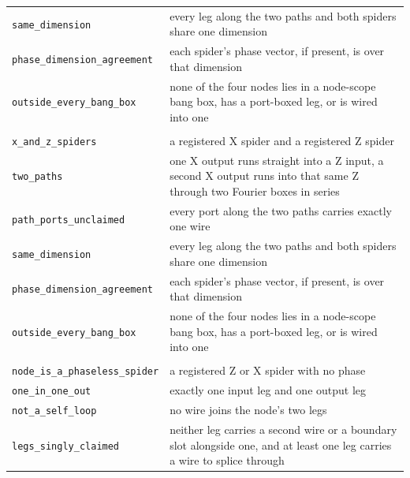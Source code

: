 \begin{xltabular}{\textwidth}{@{}>{\raggedright\arraybackslash}p{0.42\textwidth}>{\raggedright\arraybackslash}X@{}}
\quad\texttt{same\_\allowbreak{}dimension} & every leg along the two paths and both spiders share one dimension \\
\quad\texttt{phase\_\allowbreak{}dimension\_\allowbreak{}agreement} & each spider's phase vector, if present, is over that dimension \\
\quad\texttt{outside\_\allowbreak{}every\_\allowbreak{}bang\_\allowbreak{}box} & none of the four nodes lies in a node-scope bang box, has a port-boxed leg, or is wired into one \\
\midrule
{}\\
\quad\texttt{x\_\allowbreak{}and\_\allowbreak{}z\_\allowbreak{}spiders} & a registered X spider and a registered Z spider \\
\quad\texttt{two\_\allowbreak{}paths} & one X output runs straight into a Z input, a second X output runs into that same Z through two Fourier boxes in series \\
\quad\texttt{path\_\allowbreak{}ports\_\allowbreak{}unclaimed} & every port along the two paths carries exactly one wire \\
\quad\texttt{same\_\allowbreak{}dimension} & every leg along the two paths and both spiders share one dimension \\
\quad\texttt{phase\_\allowbreak{}dimension\_\allowbreak{}agreement} & each spider's phase vector, if present, is over that dimension \\
\quad\texttt{outside\_\allowbreak{}every\_\allowbreak{}bang\_\allowbreak{}box} & none of the four nodes lies in a node-scope bang box, has a port-boxed leg, or is wired into one \\
\midrule
{}\\
\quad\texttt{node\_\allowbreak{}is\_\allowbreak{}a\_\allowbreak{}phaseless\_\allowbreak{}spider} & a registered Z or X spider with no phase \\
\quad\texttt{one\_\allowbreak{}in\_\allowbreak{}one\_\allowbreak{}out} & exactly one input leg and one output leg \\
\quad\texttt{not\_\allowbreak{}a\_\allowbreak{}self\_\allowbreak{}loop} & no wire joins the node's two legs \\
\quad\texttt{legs\_\allowbreak{}singly\_\allowbreak{}claimed} & neither leg carries a second wire or a boundary slot alongside one, and at least one leg carries a wire to splice through \\

\end{xltabular}
